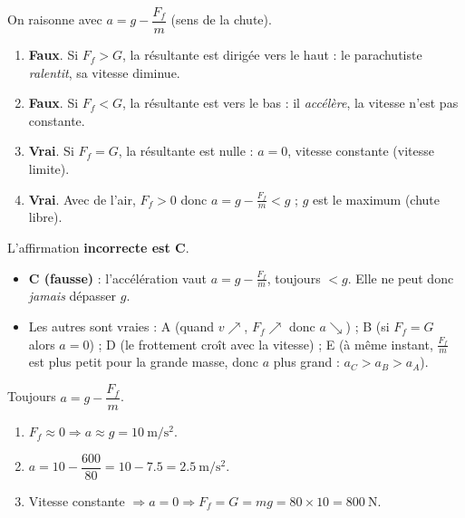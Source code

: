 \documentclass[11pt,a4paper]{article}
\begin{document}

\begin{corrige}
On raisonne avec $a=g-\dfrac{F_f}{m}$ (sens de la chute).
\begin{enumerate}[label=\Alph*.]
  \item \textbf{Faux}. Si $F_f>G$, la résultante est dirigée vers le haut : le parachutiste \emph{ralentit}, sa vitesse diminue.
  \item \textbf{Faux}. Si $F_f<G$, la résultante est vers le bas : il \emph{accélère}, la vitesse n'est pas constante.
  \item \textbf{Vrai}. Si $F_f=G$, la résultante est nulle : $a=0$, vitesse constante (vitesse limite).
  \item \textbf{Vrai}. Avec de l'air, $F_f>0$ donc $a=g-\tfrac{F_f}{m}<g$ ; $g$ est le maximum (chute libre).
\end{enumerate}
\end{corrige}

\begin{corrige}
L'affirmation \textbf{incorrecte est C}.
\begin{itemize}[leftmargin=1.4em,topsep=2pt,itemsep=1.5pt]
  \item \textbf{C (fausse)} : l'accélération vaut $a=g-\tfrac{F_f}{m}$, toujours $<g$. Elle ne peut donc
        \emph{jamais} dépasser $g$.
  \item Les autres sont vraies : A (quand $v\nearrow$, $F_f\nearrow$ donc $a\searrow$) ; B (si $F_f=G$ alors $a=0$) ;
        D (le frottement croît avec la vitesse) ; E (à même instant, $\tfrac{F_f}{m}$ est plus petit pour la
        grande masse, donc $a$ plus grand : $a_C>a_B>a_A$).
\end{itemize}
\end{corrige}

\begin{corrige}
Toujours $a=g-\dfrac{F_f}{m}$.
\begin{enumerate}[label=\alph*)]
  \item $F_f\approx 0 \Rightarrow a\approx g=\qty{10}{\metre\per\second\squared}$.
  \item $a=10-\dfrac{600}{80}=10-\num{7,5}=\qty{2,5}{\metre\per\second\squared}$.
  \item Vitesse constante $\Rightarrow a=0 \Rightarrow F_f=G=mg=80\times 10=\qty{800}{\newton}$.
\end{enumerate}
\end{corrige}
\end{document}
